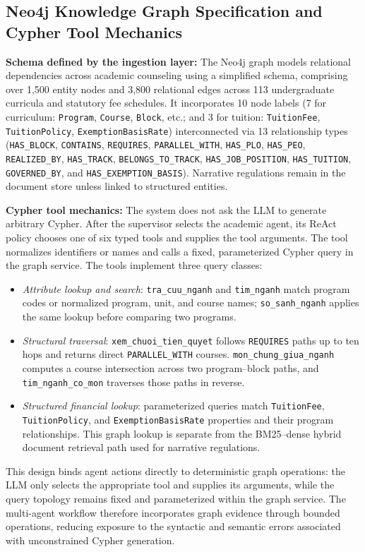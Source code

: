 \subsection{Neo4j Knowledge Graph Specification and Cypher Tool Mechanics}
\label{sec:neo4j_graph}

\textbf{Schema defined by the ingestion layer:}
The Neo4j graph models relational dependencies across academic counseling using a simplified schema, comprising over 1,500 entity nodes and 3,800 relational edges across 113 undergraduate curricula and statutory fee schedules. It incorporates 10 node labels (7 for curriculum: \texttt{Program}, \texttt{Course}, \texttt{Block}, etc.; and 3 for tuition: \texttt{TuitionFee}, \texttt{TuitionPolicy}, \texttt{ExemptionBasisRate}) interconnected via 13 relationship types (\texttt{HAS\_BLOCK}, \texttt{CONTAINS}, \texttt{REQUIRES}, \texttt{PARALLEL\_WITH}, \texttt{HAS\_PLO}, \texttt{HAS\_PEO}, \texttt{REALIZED\_BY}, \texttt{HAS\_TRACK}, \texttt{BELONGS\_TO\_TRACK}, \texttt{HAS\_JOB\_POSITION}, \texttt{HAS\_TUITION}, \texttt{GOVERNED\_BY}, and \texttt{HAS\_EXEMPTION\_BASIS}). Narrative regulations remain in the document store unless linked to structured entities.

\textbf{Cypher tool mechanics:}
The system does not ask the LLM to generate arbitrary Cypher. After the supervisor selects the academic agent, its ReAct policy chooses one of six typed tools and supplies the tool arguments. The tool normalizes identifiers or names and calls a fixed, parameterized Cypher query in the graph service. The tools implement three query classes:
\begin{itemize}
    \setlength{\itemsep}{1.5pt}
    \setlength{\parsep}{0pt}
    \setlength{\parskip}{0pt}
    \item \emph{Attribute lookup and search}: \texttt{tra\_cuu\_nganh} and \texttt{tim\_nganh} match program codes or normalized program, unit, and course names; \texttt{so\_sanh\_nganh} applies the same lookup before comparing two programs.
    \item \emph{Structural traversal}: \texttt{xem\_chuoi\_tien\_quyet} follows \texttt{REQUIRES} paths up to ten hops and returns direct \texttt{PARALLEL\_WITH} courses. \texttt{mon\_chung\_giua\_nganh} computes a course intersection across two program--block paths, and \texttt{tim\_nganh\_co\_mon} traverses those paths in reverse.
    \item \emph{Structured financial lookup}: parameterized queries match \texttt{TuitionFee}, \texttt{TuitionPolicy}, and \texttt{ExemptionBasisRate} properties and their program relationships. This graph lookup is separate from the BM25--dense hybrid document retrieval path used for narrative regulations.
\end{itemize}
This design binds agent actions directly to deterministic graph operations: the LLM only selects the appropriate tool and supplies its arguments, while the query topology remains fixed and parameterized within the graph service. The multi-agent workflow therefore incorporates graph evidence through bounded operations, reducing exposure to the syntactic and semantic errors associated with unconstrained Cypher generation.

